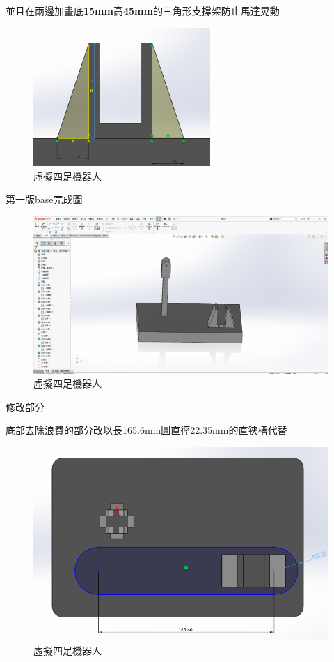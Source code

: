 \noindent 並且在兩邊加畫底\textbf{15mm}高\textbf{45mm}的三角形支撐架防止馬達晃動

\begin{figure}[h!]
    \centering
    \includegraphics[width=0.6\textwidth]{./../images/6-1-35.png}
    \caption{\Large 虛擬四足機器人}
\end{figure}

\noindent 第一版base完成圖

\begin{figure}[h!]
    \centering
    \includegraphics[width=1\textwidth]{./../images/6-1-36.png}
    \caption{\Large 虛擬四足機器人}
\end{figure}

\noindent 修改部分

\noindent 底部去除浪費的部分改以長165.6mm圓直徑22.35mm的直狹槽代替

\begin{figure}[h!]
    \centering
    \includegraphics[width=1\textwidth]{./../images/6-1-37.png}
    \caption{\Large 虛擬四足機器人}
\end{figure}

